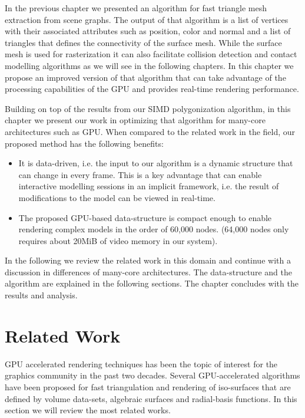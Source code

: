 \label{chapter:GPUDiscretization}
In the previous chapter we presented an algorithm for fast triangle mesh extraction from \blob scene graphs. The output of that 
algorithm is a list of vertices with their associated attributes such as position, color and normal and a list of triangles that
defines the connectivity of the surface mesh. While the surface mesh is used for rasterization it can also facilitate  
collision detection and contact modelling algorithms as we will see in the following chapters.  In this chapter we propose an improved 
version of that algorithm that can take advantage of the processing capabilities of the GPU and provides real-time \blob rendering performance. 

Building on top of the results from our SIMD polygonization algorithm, in this chapter we present our work in optimizing that 
algorithm for many-core architectures such as GPU. When compared to the related work in the field, our proposed method has the following
benefits:

\begin{itemize}
 \item It is data-driven, i.e. the input to our algorithm is a dynamic \blob structure that can change 
 in every frame. This is a key advantage that can enable interactive modelling sessions in an implicit 
 framework, i.e. the result of modifications to the model can be viewed in real-time.

 \item The proposed GPU-based data-structure is compact enough to enable rendering complex \blob models 
 in the order of 60,000 nodes. (64,000 nodes only requires about 20MiB of video memory in our system).
\end{itemize}

In the following we review the related work in this domain and continue with a discussion in differences of many-core 
architectures. The data-structure and the algorithm are explained in the following sections. The chapter concludes with 
the results and analysis.



\section{Related Work}
GPU accelerated rendering techniques has been the topic of interest for the graphics community in the past two decades.
Several GPU-accelerated algorithms have been proposed for fast triangulation and rendering of iso-surfaces that are defined by
volume data-sets, algebraic surfaces and radial-basis functions. In this section we will review the most related works.

